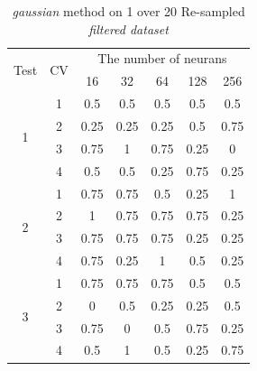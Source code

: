 \documentclass[draft,dvipsnames]{drexel-thesis}
\begin{document}
\begin{thesis}
\begin{table}[!t]
\centering
\caption{{\em gaussian} method on 1 over 20 Re-sampled {\em filtered dataset}}
\label{tbl:gaussian_1_20}
\begin{tabular}{|c|c|c|c|c|c|c|}
\hline
\multirow{2}{*}{Test} & \multirow{2}{*}{CV} & \multicolumn{5}{c|}{The number of neurans}                               \\ \cline{3-7}
                      &                     & 16           & 32           & 64           & 128          & 256          \\ \hline
\multirow{4}{*}{1}    & 1                   & 0.5          & 0.5          & 0.5          & 0.5          & 0.5          \\ \cline{2-7}
                      & 2                   & 0.25         & 0.25         & 0.25         & 0.5          & 0.75         \\ \cline{2-7}
                      & 3                   & 0.75         & 1            & 0.75         & 0.25         & 0            \\ \cline{2-7}
                      & 4                   & 0.5          & 0.5          & 0.25         & 0.75         & 0.25         \\ \hline
\multirow{4}{*}{2}    & 1                   & 0.75         & 0.75         & 0.5          & 0.25         & 1            \\ \cline{2-7}
                      & 2                   & 1            & 0.75         & 0.75         & 0.75         & 0.25         \\ \cline{2-7}
                      & 3                   & 0.75         & 0.75         & 0.75         & 0.25         & 0.25         \\ \cline{2-7}
                      & 4                   & 0.75         & 0.25         & 1            & 0.5          & 0.25         \\ \hline
\multirow{4}{*}{3}    & 1                   & 0.75         & 0.75         & 0.75         & 0.5          & 0.5          \\ \cline{2-7}
                      & 2                   & 0            & 0.5          & 0.25         & 0.25         & 0.5          \\ \cline{2-7}
                      & 3                   & 0.75         & 0            & 0.5          & 0.75         & 0.25         \\ \cline{2-7}
                      & 4                   & 0.5          & 1            & 0.5          & 0.25         & 0.75         \\ \hline

\end{tabular}
\end{table}
\end{thesis}
\end{document}

